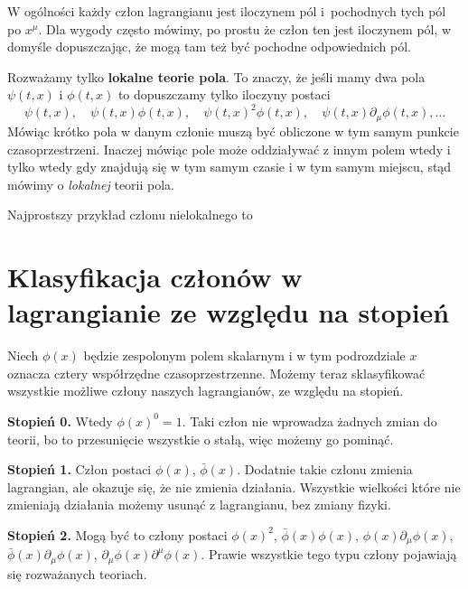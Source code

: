 \documentclass[a4paper,11pt]{article}
\begin{document}
W ogólności każdy człon lagrangianu jest iloczynem pól i~pochodnych tych pól po $x^{ \mu }$. Dla wygody często mówimy, po prostu że człon ten jest iloczynem pól, w domyśle dopuszczając, że mogą tam też być pochodne odpowiednich pól.

Rozważamy tylko \textbf{lokalne teorie pola}. To znaczy, że jeśli mamy dwa pola $\psi( t, x )$ i $\phi( t, x )$ to dopuszczamy tylko iloczyny postaci
\begin{equation}
  \label{eq:3}
  \psi( t, x ), \quad \psi( t, x ) \phi( t, x ), \quad \psi( t, x )^{ 2 } \phi( t, x ), \quad
  \psi( t, x ) \partial_{ \mu }\phi( t, x ), \ldots
\end{equation}
Mówiąc krótko pola w danym członie muszą być obliczone w tym samym punkcie czasoprzestrzeni. Inaczej mówiąc pole może oddziaływać z innym polem wtedy i tylko wtedy gdy znajdują się w tym samym czasie i w tym samym miejscu, stąd mówimy o \textit{lokalnej} teorii pola.

Najprostszy przykład członu nielokalnego to






\section{Klasyfikacja członów w lagrangianie ze względu na stopień}


Niech $\phi( x )$ będzie zespolonym polem skalarnym i w tym podrozdziale
$x$ oznacza cztery współrzędne czasoprzestrzenne. Możemy teraz
sklasyfikować wszystkie możliwe człony naszych lagrangianów, ze
względu na stopień.

\textbf{Stopień 0.} Wtedy $\phi( x )^{ 0 } = 1$. Taki człon nie wprowadza
żadnych zmian do teorii, bo to przesunięcie wszystkie o stałą, więc
możemy go pominąć.

\textbf{Stopień 1.} Człon postaci $\phi( x )$, $\bar{\phi}( x )$. Dodatnie
takie członu zmienia lagrangian, ale okazuje się, że nie zmienia
działania. Wszystkie wielkości które nie zmieniają działania możemy
usunąć z lagrangianu, bez zmiany fizyki.

\textbf{Stopień 2.} Mogą być to człony postaci $\phi( x )^{ 2 }$,
$\bar{\phi}( x ) \phi( x )$, $\phi( x ) \partial_{ \mu } \phi( x )$,
$\bar{\phi}( x ) \partial_{ \mu } \phi( x )$,
$\partial_{ \mu } \phi( x ) \partial^{ \mu } \phi( x )$. Prawie wszystkie tego typu człony
pojawiają się rozważanych teoriach.
\end{document}
